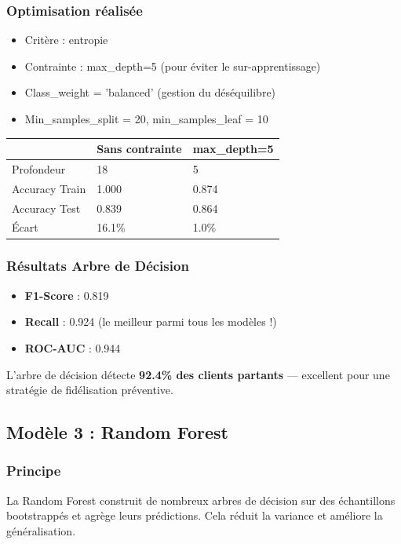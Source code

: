 \documentclass[11pt,a4paper]{article}
\begin{document}
\subsubsection{Optimisation réalisée}
\begin{itemize}
    \item Critère : entropie
    \item Contrainte : max\_depth=5 (pour éviter le sur-apprentissage)
    \item Class\_weight = 'balanced' (gestion du déséquilibre)
    \item Min\_samples\_split = 20, min\_samples\_leaf = 10
\end{itemize}

\begin{tcolorbox}[title=�� Impact de la profondeur maximale]
\begin{tabular}{L{4cm} C{3cm} C{3cm}}
\toprule
& \textbf{Sans contrainte} & \textbf{max\_depth=5} \\
\midrule
Profondeur & 18 & 5 \\
Accuracy Train & 1.000 & 0.874 \\
Accuracy Test & 0.839 & 0.864 \\
Écart & 16.1\% & 1.0\% \\
\bottomrule
\end{tabular}
\end{tcolorbox}

\subsubsection{Résultats Arbre de Décision}
\begin{itemize}
    \item \textbf{F1-Score} : 0.819
    \item \textbf{Recall} : 0.924 (le meilleur parmi tous les modèles !)
    \item \textbf{ROC-AUC} : 0.944
\end{itemize}

L'arbre de décision détecte \textbf{92.4\% des clients partants} — excellent pour 
une stratégie de fidélisation préventive.

\subsection{Modèle 3 : Random Forest}

\subsubsection{Principe}
La Random Forest construit de nombreux arbres de décision sur des échantillons 
bootstrappés et agrège leurs prédictions. Cela réduit la variance et améliore 
la généralisation.
\end{document}
